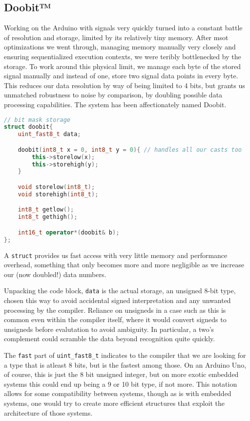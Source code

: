 \subsection{Doobit™}
\label{sec:doobit}

Working on the Arduino with signals very quickly turned into a constant battle
of resolution and storage, limited by its relatively tiny memory. After msot
optimizations we went through, managing memory manually very closely and
ensuring sequentialized execution contexts, we were teribly bottlenecked by the
storage. To work around this physical limit, we manage each byte of the stored
signal manually and instead of one, store two signal data points in every byte.
This reduces our data resolution by way of being limited to 4 bits, but grants
us unmatched robustness to noise by comparison, by doubling possible data
processing capabilities. The system has been affectionately named Doobit.

\begin{lstlisting}[language=C++]
// bit mask storage
struct doobit{
    uint_fast8_t data;

    doobit(int8_t x = 0, int8_t y = 0){ // handles all our casts too
        this->storelow(x);
        this->storehigh(y);
    }

    void storelow(int8_t);
    void storehigh(int8_t);

    int8_t getlow();
    int8_t gethigh();

    int16_t operator*(doobit& b);
};
\end{lstlisting}

A \texttt{struct} provides us fast access with very little memory and
performance overhead, something that only becomes more and more negligible as we
increase our (now doubled!) data numbers.

Unpacking the code block, \texttt{data} is the actual storage, an unsigned 8-bit
type, chosen this way to avoid accidental signed interpretation and any unwanted
processing by the compiler. Reliance on unsigneds in a case such as this is
common even within the compiler itself, where it would convert signeds to
unsigneds before evalutation to avoid ambiguity. In particular, a two's
complement could scramble the data beyond recognition quite quickly.

The \texttt{fast} part of \texttt{uint\_fast8\_t} indicates to the compiler that
we are looking for a type that is atleast 8 bits, but is the fastest among
those. On an Arduino Uno, of course, this is just the 8 bit unsigned integer,
but on more exotic embedded systems this could end up being a 9 or 10 bit type,
if not more. This notation allows for some compatibility between systems, though
as is with embedded systems, one would try to create more efficient structures
that exploit the architecture of those systems.

